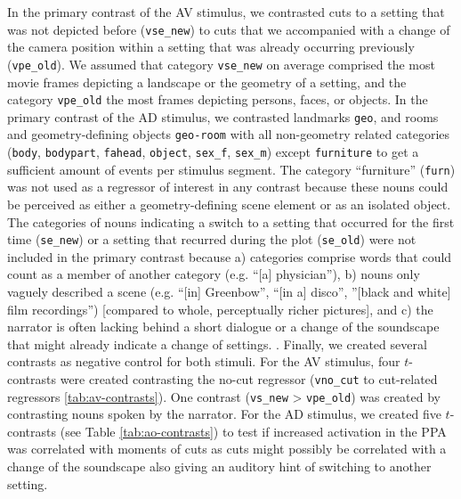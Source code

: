 \documentclass[english]{article}
\begin{document}
In the primary contrast of the AV stimulus, we contrasted cuts to a setting that
was not depicted before (\texttt{vse\_new}) to cuts that we accompanied with a
change of the camera position within a setting that was already occurring
previously (\texttt{vpe\_old}).
We assumed that category \texttt{vse\_new} on average comprised the most movie
frames depicting a landscape or the geometry of a setting, and the category
\texttt{vpe\_old} the most frames depicting persons, faces, or
objects.
In the primary contrast of the AD stimulus, we contrasted landmarks
\texttt{geo}, and rooms and geometry-defining objects \texttt{geo-room} with all
non-geometry related categories (\texttt{body}, \texttt{bodypart},
\texttt{fahead}, \texttt{object}, \texttt{sex\_f}, \texttt{sex\_m}) except
\texttt{furniture} to get a sufficient amount of events per stimulus segment.
The category ``furniture'' (\texttt{furn}) was not used as a regressor of
interest in any contrast because these nouns could be perceived as either a
geometry-defining scene element or as an isolated object.
The categories of nouns indicating a switch to a setting that occurred for the
first time (\texttt{se\_new}) or a setting that recurred during the plot
(\texttt{se\_old}) were not included in the primary contrast because
a) categories comprise words that could count as a member of another category
(e.g. ``[a] physician''),
b) nouns only vaguely described a scene (e.g. ``[in] Greenbow'', ``[in a]
disco'', ''[black and white] film recordings'') [compared to whole, perceptually
richer pictures], and
c) the narrator is often lacking behind a short dialogue or a change of the
soundscape that might already indicate a change of settings.
.
Finally, we created several contrasts as negative control for both stimuli.
For the AV stimulus, four $t$-contrasts were created contrasting the no-cut
regressor (\texttt{vno\_cut} to cut-related regressors \ref{tab:av-contrasts}).
One contrast (\texttt{vs\_new} > \texttt{vpe\_old}) was created by contrasting
nouns spoken by the narrator.
For the AD stimulus, we created five $t$-contrasts (see Table
\ref{tab:ao-contrasts}) to test if increased activation in the PPA was
correlated with moments of cuts as cuts might possibly be correlated with a
change of the soundscape also giving an auditory hint of switching to another
setting.
%
\end{document}
